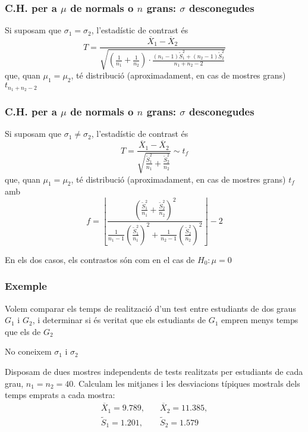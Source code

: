 \documentclass[12pt,t]{beamer}
\theoremstyle{plain}
\theoremstyle{definition}
\begin{document}
\begin{frame}
\frametitle{C.H. per a $\mu$ de normals o $n$ grans: $\sigma$ desconegudes}

Si suposam que $\sigma_1=\sigma_2$, l'estadístic de contrast és
$$
T=\frac{\overline{X}_1-\overline{X}_2}%
{\sqrt{(\frac{1}{n_1}+\frac{1}{n_2})\cdot 
\frac{(n_1-1)\widetilde{S}_1^2+(n_2-1)\widetilde{S}_2^2}%
{n_1+n_2-2}}}
$$
que, quan $\mu_1=\mu_2$, té distribució (aproximadament, en cas de mostres grans) $t_{n_1+n_2-2}$
\end{frame}


\begin{frame}
\frametitle{C.H. per a $\mu$ de normals o $n$ grans: $\sigma$ desconegudes}
\vspace*{-3ex}

Si suposam que $\sigma_1\neq \sigma_2$, l'estadístic de contrast és
$$
T=\frac{\overline{X}_1-\overline{X}_2}{\sqrt{\frac{\widetilde{S}_1^2}{n_1}+\frac{\widetilde{S}_2^2}{n_2}}}\sim t_f
$$
que, quan $\mu_1=\mu_2$, té distribució (aproximadament, en cas de mostres grans) $t_{f}$ amb
$$
f=\left\lfloor\frac{\displaystyle \left( \frac{\widetilde{S}_1^2}{n_1}+\frac{\widetilde{S}_2^2}{n_2}\right)^2}%
{\displaystyle \frac{1}{n_1-1}\left(\frac{\widetilde{S}_1^2}{n_1}\right)^2+\frac{1}{n_2-1}\left(\frac{\widetilde{S}_2^2}{n_2}\right)^2}\right\rfloor -2
$$



En els dos casos, els contrastos són com en el cas de $H_0:\mu=0$
\end{frame}

\begin{frame}
\frametitle{Exemple}

Volem comparar els temps de realització d'un test entre estudiants de dos graus $G_1$ i $G_2$, i determinar si és veritat que els estudiants de $G_1$ empren menys temps que els de $G_2$
\medskip

No coneixem $\sigma_1$ i $\sigma_2$
\medskip


Disposam de dues mostres independents  de tests realitzats per estudiants de cada grau, $n_1=n_2=40$. Calculam les mitjanes i les desviacions típiques
mostrals dels temps emprats a cada mostra:
$$
\begin{array}{ll}
\overline{X}_1= 9.789,&\quad  \overline{X}_2=11.385,\\[1ex]
\widetilde{S}_1=1.201,&\quad \widetilde{S}_2=1.579
\end{array}
$$
\end{frame}
\end{document}
